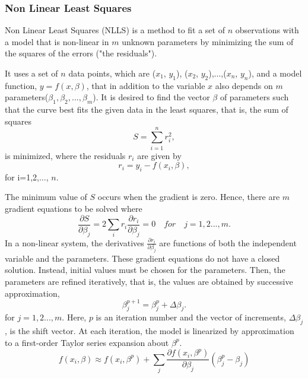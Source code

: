 \documentclass[journal]{IEEEtran}
\begin{document}
\subsubsection{\textbf{Non Linear Least Squares}}
\par Non Linear Least Squares (NLLS) is a method to fit a set of $n$ observations with a model that is non-linear in $m$ unknown parameters by minimizing the sum of the squares of the errors ("the residuals").
\par
It uses a set of $n$ data points, which are ($x_1$, $y_1$), ($x_2$, $y_2$),$\dots$,($x_n$, $y_n$), and a model function, $y= f(x, \beta)$, that in addition to the variable $x$ also depends on $m$ parameters($\beta_1,\beta_2,...,\beta_m$).
It is desired to find the vector $\beta$ of parameters such that the curve best fits the given data in the least squares, that is, the sum of squares
\begin{equation}
    S=\sum_{i=1}^{n}r_i^2 ,
\end{equation}
is minimized, where the residuals $r_i$ are given by
\begin{equation}
    r_i = y_i - f(x_i,\beta),
\end{equation}
for i=1,2,$\dots$, $n$.
\par
The minimum value of $S$ occurs when the gradient is zero. Hence, there are $m$ gradient equations to be solved where
\begin{equation}
    \frac{\partial S}{\partial \beta_j}=2\sum_i r_i\frac{\partial r_i}{\partial \beta_j}=0  \quad for \quad j=1,2...,m.
\end{equation}
In a non-linear system, the derivatives $\frac{\partial r_i}{\partial \beta_j}$ are functions of both the independent
variable and the parameters. These gradient equations do not have a closed solution. Instead, initial values must be chosen for the
parameters. Then, the parameters are refined iteratively, that is, the values are obtained by successive approximation,
\begin{equation}
    \beta_j^{p+1}=\beta^p_j+\Delta \beta_j.
\end{equation}
for $j=1,2...,m.$ Here, $p$ is an iteration number and the vector of increments, $\Delta \beta_j$, is the shift vector. At each iteration, the model is linearized by approximation to a first-order Taylor series expansion about $\beta^p$.
\begin{equation}
    f(x_i,\beta)\approx f(x_i,\beta^p) +\sum_j \frac{\partial f(x_i, \beta^p)}{\partial \beta_j} \left(\beta^p_j -\beta_j \right)
\end{equation}
\end{document}
